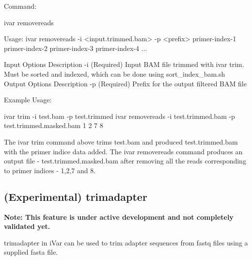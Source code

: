 Command\+: 
\begin{DoxyCode}
ivar removereads

Usage: ivar removereads -i <input.trimmed.bam> -p <prefix> primer-index-1 primer-index-2 primer-index-3
       primer-index-4 ...

Input Options    Description
           -i    (Required) Input BAM file  trimmed with ivar trim. Must be sorted and indexed, which can
       be done using sort\_index\_bam.sh
Output Options   Description
           -p    (Required) Prefix for the output filtered BAM file
\end{DoxyCode}


Example Usage\+: 
\begin{DoxyCode}
ivar trim -i test.bam -p test.trimmed
ivar removereads -i test.trimmed.bam -p test.trimmed.masked.bam 1 2 7 8
\end{DoxyCode}


The {\ttfamily ivar trim} command above trims test.\+bam and produced test.\+trimmed.\+bam with the primer indice data added. The {\ttfamily ivar removereads} command produces an output file -\/ test.\+trimmed.\+masked.\+bam after removing all the reads corresponding to primer indices -\/ 1,2,7 and 8.\hypertarget{manualpage_autotoc_md10}{}\subsection{(\+Experimental) trimadapter}\label{manualpage_autotoc_md10}
{\bfseries Note\+: This feature is under active development and not completely validated yet.}

trimadapter in i\+Var can be used to trim adapter sequences from fastq files using a supplied fasta file. 